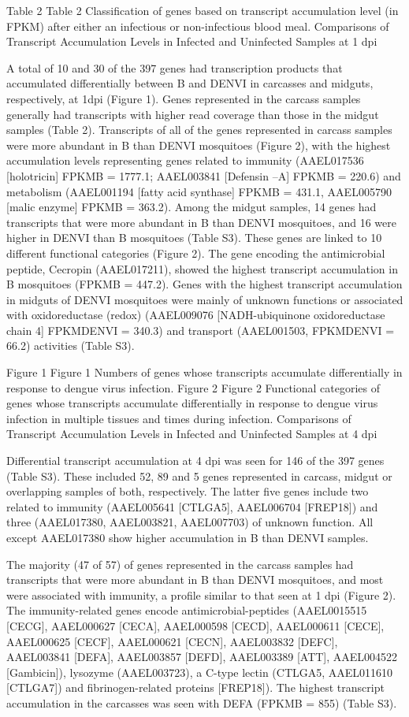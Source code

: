 Table 2
Table 2
Classification of genes based on transcript accumulation level (in FPKM) after either an infectious or non-infectious blood meal.
Comparisons of Transcript Accumulation Levels in Infected and Uninfected Samples at 1 dpi

A total of 10 and 30 of the 397 genes had transcription products that accumulated differentially between B and DENVI in carcasses and midguts, respectively, at 1dpi (Figure 1).
Genes represented in the carcass samples generally had transcripts with higher read coverage than those in the midgut samples (Table 2).
Transcripts of all of the genes represented in carcass samples were more abundant in B than DENVI mosquitoes (Figure 2), with the highest accumulation levels representing genes related to immunity (AAEL017536 [holotricin] FPKMB = 1777.1; AAEL003841 [Defensin –A] FPKMB = 220.6) and metabolism (AAEL001194 [fatty acid synthase] FPKMB = 431.1, AAEL005790 [malic enzyme] FPKMB = 363.2).
Among the midgut samples, 14 genes had transcripts that were more abundant in B than DENVI mosquitoes, and 16 were higher in DENVI than B mosquitoes (Table S3).
These genes are linked to 10 different functional categories (Figure 2).
The gene encoding the antimicrobial peptide, Cecropin (AAEL017211), showed the highest transcript accumulation in B mosquitoes (FPKMB = 447.2).
Genes with the highest transcript accumulation in midguts of DENVI mosquitoes were mainly of unknown functions or associated with oxidoreductase (redox) (AAEL009076 [NADH-ubiquinone oxidoreductase chain 4] FPKMDENVI = 340.3) and transport (AAEL001503, FPKMDENVI = 66.2) activities (Table S3).

Figure 1
Figure 1
Numbers of genes whose transcripts accumulate differentially in response to dengue virus infection.
Figure 2
Figure 2
Functional categories of genes whose transcripts accumulate differentially in response to dengue virus infection in multiple tissues and times during infection.
Comparisons of Transcript Accumulation Levels in Infected and Uninfected Samples at 4 dpi

Differential transcript accumulation at 4 dpi was seen for 146 of the 397 genes (Table S3).
These included 52, 89 and 5 genes represented in carcass, midgut or overlapping samples of both, respectively.
The latter five genes include two related to immunity (AAEL005641 [CTLGA5], AAEL006704 [FREP18]) and three (AAEL017380, AAEL003821, AAEL007703) of unknown function.
All except AAEL017380 show higher accumulation in B than DENVI samples.

The majority (47 of 57) of genes represented in the carcass samples had transcripts that were more abundant in B than DENVI mosquitoes, and most were associated with immunity, a profile similar to that seen at 1 dpi (Figure 2).
The immunity-related genes encode antimicrobial-peptides (AAEL0015515 [CECG], AAEL000627 [CECA], AAEL000598 [CECD], AAEL000611 [CECE], AAEL000625 [CECF], AAEL000621 [CECN], AAEL003832 [DEFC], AAEL003841 [DEFA], AAEL003857 [DEFD], AAEL003389 [ATT], AAEL004522 [Gambicin]), lysozyme (AAEL003723), a C-type lectin (CTLGA5, AAEL011610 [CTLGA7]) and fibrinogen-related proteins [FREP18]).
The highest transcript accumulation in the carcasses was seen with DEFA (FPKMB = 855) (Table S3).

